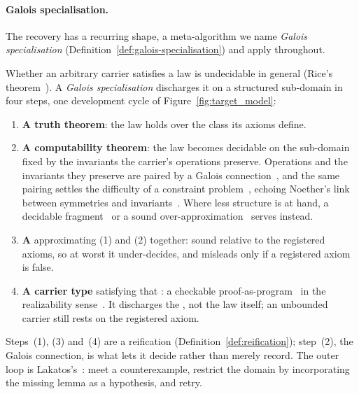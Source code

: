 \documentclass[11pt, a4paper]{article}
\begin{document}
\paragraph{Galois specialisation.}
The recovery has a recurring shape, a meta-algorithm we name \emph{Galois specialisation} (Definition~\ref{def:galois-specialisation}) and apply throughout.
\begin{definition}
\label{def:galois-specialisation}
Whether an arbitrary carrier satisfies a law is undecidable in general (Rice's theorem~\cite{rice1953classes}).
A \emph{Galois specialisation} discharges it on a structured sub-domain in four steps, one development cycle of Figure~\ref{fig:target_model}:
\begin{enumerate}
\item \textbf{A truth theorem}: the law holds over the class its axioms define.
\item \textbf{A computability theorem}: the law becomes decidable on the sub-domain fixed by the invariants the carrier's operations preserve. Operations and the invariants they preserve are paired by a Galois connection~\cite{geiger1968closed}, and the same pairing settles the difficulty of a constraint problem~\cite{zhuk2020proof}, echoing Noether's link between symmetries and invariants~\cite{noether1918invariante}. Where less structure is at hand, a decidable fragment~\cite{borger2001classical} or a sound over-approximation~\cite{cousot1977abstract} serves instead.
\item \textbf{A } approximating (1) and (2) together: sound relative to the registered axioms, so at worst it under-decides, and misleads only if a registered axiom is false.
\item \textbf{A carrier type} satisfying that : a checkable proof-as-program~\cite{wadler2015propositions} in the realizability sense~\cite{kleene1945realizability}. It discharges the , not the law itself; an unbounded carrier still rests on the registered axiom.
\end{enumerate}
Steps~(1), (3) and~(4) are a reification (Definition~\ref{def:reification}); step~(2), the Galois connection, is what lets it decide rather than merely record.
The outer loop is Lakatos's~\cite{lakatos1976proofs}: meet a counterexample, restrict the domain by incorporating the missing lemma as a hypothesis, and retry.
\end{definition}
\end{document}
